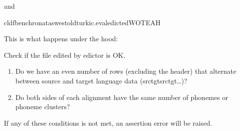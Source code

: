 \documentclass[letterpaper,10pt,english]{sphinxmanual}
\begin{document}
\sphinxAtStartPar
and

\begin{sphinxVerbatim}[commandchars=\\\{\}]
cldfbenchronataswestoldturkic.evaledictedWOTEAH
\end{sphinxVerbatim}

\sphinxAtStartPar
This is what happens under the hood:

\label{\detokenize{mkedictor:module-ronataswestoldturkiccommands.evaledicted}}
\sphinxAtStartPar
Check if the file edited by edictor is OK.
\begin{enumerate}
%
\item {} 
\sphinxAtStartPar
Do we have an even number of rows (excluding the header) that alternate between source and target language data (src\sphinxhyphen{}tgt\sphinxhyphen{}src\sphinxhyphen{}tgt\sphinxhyphen{}…)?

\item {} 
\sphinxAtStartPar
Do both sides of each alignment have the same number of phonemes or phoneme clusters?

\end{enumerate}

\sphinxAtStartPar
If any of these conditions is not met, an assertion error will be raised.
\end{document}
